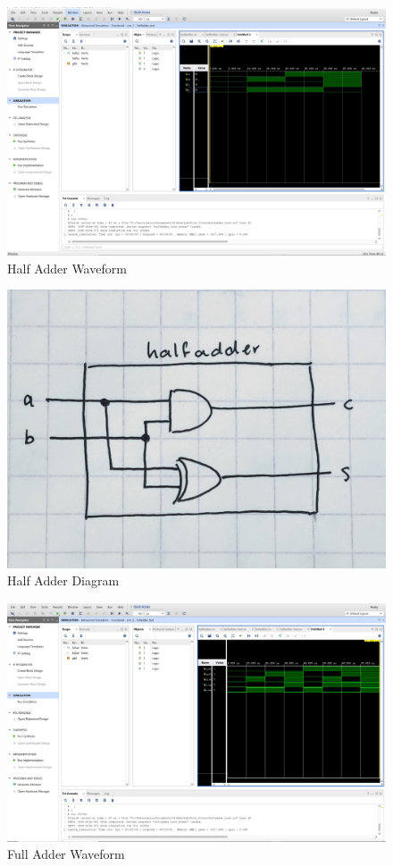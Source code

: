 \documentclass[11pt]{article}
\begin{document}
\begin{figure}[ht] \includegraphics[width=1\textwidth,trim=19cm 14cm 0cm 6cm,clip]{halfadder_screen}
	\caption{Half Adder Waveform}
	\label{fig:halfadder_scrn}
\end{figure}

\begin{figure}[ht]\centering
	\includegraphics[width=.75\textwidth]{halfadder_diagram}
	\caption{Half Adder Diagram}
	\label{fig:ha_diagram}			
\end{figure}

\begin{figure}[ht] \includegraphics[width=1\textwidth,trim=19cm 14cm 0cm 6cm,clip]{fulladder_screen1}
	\caption{Full Adder Waveform}
	\label{fig:fulladder_scrn}
\end{figure}
\end{document}
